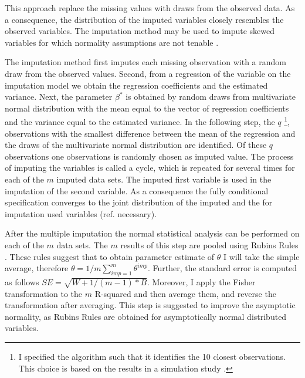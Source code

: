 This approach replace the missing values with draws from the observed data.
As a consequence, the distribution of the imputed variables closely resembles the observed variables.
The imputation method may be used to impute skewed variables for which normality assumptions are not tenable \parencite{}. \par
The imputation method first imputes each missing observation with a random draw from the observed values.
Second, from a regression of the variable on the imputation model  we obtain the regression coefficients and the estimated variance.
Next, the parameter $\beta^*$ is obtained by random draws from multivariate normal distribution with the mean equal to the vector of regression coefficients and the variance equal to the estimated variance.
In the following step, the $q$ \footnote{I specified the algorithm such that it identifies the 10 closest observations.
 This choice is based on the results in a simulation study \textcite{Morris2014}.}, observations with the smallest difference between the mean of the regression and the draws of the multivariate normal distribution are identified.
Of these $q$ observations one observations is randomly chosen as imputed value.
The process of imputing the variables is called a cycle, which is repeated for several times for each of the $m$ imputed data sets.
The imputed first variable is used in the imputation of the second variable. 
As a consequence the fully conditional specification converges to the joint distribution of the imputed and the for imputation used variables (ref. necessary).
  \par
  After the multiple imputation the normal statistical analysis can be performed on each of the $m$ data sets.
The $m$ results of this step are pooled using Rubins Rules \textcite[p.77]{Rubin1987}.
 These rules suggest that to obtain parameter estimate of $\theta$ I will take the simple average,
therefore $\theta=1/m  \sum_{imp=1} ^m \theta^{imp}$.
Further, the standard error is computed as follows $SE=\sqrt{W+ 1/(m-1)*B}$.
Moreover, I apply the Fisher transformation to the $m$ R-squared and then average them, and reverse the transformation after averaging.
This step is suggested to improve the asymptotic normality, as Rubins Rules are obtained for asymptotically normal distributed variables.
  \endinput
